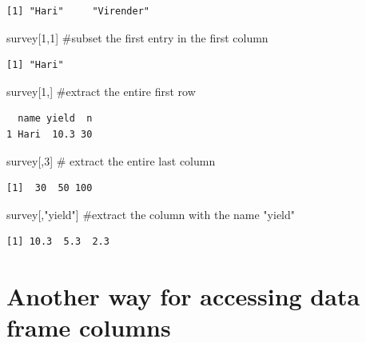 \documentclass[
  letterpaper,
  DIV=11,
  numbers=noendperiod]{scrreprt}
\newenvironment{Shaded}{\begin{snugshade}}{\end{snugshade}}
\newcommand{\CommentTok}[1]{\textcolor[rgb]{0.37,0.37,0.37}{#1}}
\newcommand{\DecValTok}[1]{\textcolor[rgb]{0.68,0.00,0.00}{#1}}
\newcommand{\NormalTok}[1]{\textcolor[rgb]{0.00,0.23,0.31}{#1}}
\newcommand{\StringTok}[1]{\textcolor[rgb]{0.13,0.47,0.30}{#1}}
\begin{document}
\begin{verbatim}
[1] "Hari"     "Virender"
\end{verbatim}

\begin{Shaded}
\begin{Highlighting}[]
\NormalTok{survey[}\DecValTok{1}\NormalTok{,}\DecValTok{1}\NormalTok{] }\CommentTok{\#subset the first entry in the first column}
\end{Highlighting}
\end{Shaded}

\begin{verbatim}
[1] "Hari"
\end{verbatim}

\begin{Shaded}
\begin{Highlighting}[]
\NormalTok{survey[}\DecValTok{1}\NormalTok{,] }\CommentTok{\#extract the entire first row  }
\end{Highlighting}
\end{Shaded}

\begin{verbatim}
  name yield  n
1 Hari  10.3 30
\end{verbatim}

\begin{Shaded}
\begin{Highlighting}[]
\NormalTok{survey[,}\DecValTok{3}\NormalTok{] }\CommentTok{\# extract the entire last column}
\end{Highlighting}
\end{Shaded}

\begin{verbatim}
[1]  30  50 100
\end{verbatim}

\begin{Shaded}
\begin{Highlighting}[]
\NormalTok{survey[,}\StringTok{"yield"}\NormalTok{] }\CommentTok{\#extract the column with the name "yield"}
\end{Highlighting}
\end{Shaded}

\begin{verbatim}
[1] 10.3  5.3  2.3
\end{verbatim}

\hypertarget{another-way-for-accessing-data-frame-columns}{%
\section{Another way for accessing data frame
columns}\label{another-way-for-accessing-data-frame-columns}}
\end{document}
